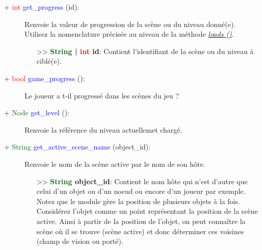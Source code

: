 \documentclass[a4paper, 11pt]{article}
\begin{document}
	\begin{description}
		\item [+ \textcolor{red}{int} \textcolor{blue}{get\_progress} (id):] Renvoie la valeur de 
		progression de la scène ou du niveau donné(e). \\Utilisez la nomenclature précisée au niveau de la 
		méthode \textit{\hyperlink{load}{loads ()}}.
		\begin{itemize}
			\item [>> \textbf{\textcolor{darkgreen}{String} | \textcolor{red}{int} id}:] Contient
			l'identifiant de la scène ou du niveau à ciblé(e).\\
		\end{itemize}
	\end{description}
	\begin{description}
		\item [+ \textcolor{red}{bool} \textcolor{blue}{game\_progress} ():] Le joueur a t-il progressé dans
		les scènes du jeu ?\\
	\end{description}
	\begin{description}
		\item [+ \textcolor{darkgreen}{Node} \textcolor{blue}{get\_level} ():] Renvoie la référence du 
		niveau actuellemet chargé.\\
	\end{description}
	\begin{description}
		\item [+ \textcolor{darkgreen}{String} \textcolor{blue}{get\_active\_scene\_name} (object\_id):] 
		Renvoie le nom de la scène active par le nom de son hôte.
		\begin{itemize}
			\item [>> \textbf{\textcolor{darkgreen}{String} object\_id}:] Contient le nom hôte qui n'est
			d'autre que celui d'un objet ou d'un noeud ou encore d'un joueur par exemple. Notez que le 
			module gère la position de plusieurs objets à la fois. Considérez l'objet comme un point 
			représentant la position de la scène active. Ainsi à partir de la position de l'objet, on peut 
			connaître la scène où il se trouve (scène active) et donc déterminer ces voisines (champ de 
			vision ou porté).\\
		\end{itemize}
	\end{description}
\end{document}
